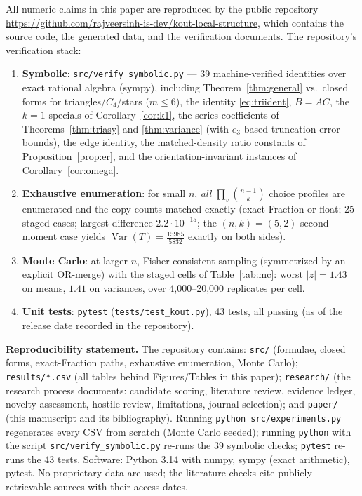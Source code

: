 \documentclass[11pt,a4paper]{article}
\theoremstyle{definition}
\theoremstyle{definition}
\begin{document}
All numeric claims in this paper are reproduced by the public repository
\url{https://github.com/rajveersinh-is-dev/kout-local-structure}, which
contains the source code, the generated data, and
the verification documents. The repository's verification stack:

\begin{enumerate}
\item \textbf{Symbolic}: \texttt{src/verify\_symbolic.py} — 39 machine-verified
identities over exact rational algebra (sympy), including Theorem~\ref{thm:general}
vs.\ closed forms for triangles/$C_4$/stars ($m\le6$), the identity
\eqref{eq:triident}, $B=AC$, the $k=1$ specials of Corollary~\ref{cor:k1}, the
series coefficients of Theorems~\ref{thm:triasy} and \ref{thm:variance}
(with $e_3$-based truncation error bounds), the edge identity, the matched-density
ratio constants of Proposition~\ref{prop:er}, and the orientation-invariant
instances of Corollary~\ref{cor:omega}.
\item \textbf{Exhaustive enumeration}: for small $n$, \emph{all}
$\prod_{v}\binom{n-1}{k}$ choice profiles are enumerated and the copy counts
matched exactly (exact-Fraction or float; 25 staged cases; largest difference
$2.2\cdot10^{-15}$; the $(n,k)=(5,2)$ second-moment case yields
$\operatorname{Var}(T) = \tfrac{15985}{5832}$ exactly on both sides).
\item \textbf{Monte Carlo}: at larger $n$, Fisher-consistent sampling
(symmetrized by an explicit OR-merge) with the staged cells of
Table~\ref{tab:mc}: worst $|z| = 1.43$ on means, $1.41$ on variances, over
4{,}000--20{,}000 replicates per cell.
\item \textbf{Unit tests}: \texttt{pytest} (\texttt{tests/test\_kout.py}),
43 tests, all passing (as of the release date recorded in the repository).
\end{enumerate}

\medskip
\noindent\textbf{Reproducibility statement.} The repository contains:
\texttt{src/} (formulae, closed forms, exact-Fraction paths, exhaustive
enumeration, Monte Carlo); \texttt{results/*.csv} (all tables behind
Figures/Tables in this paper); \texttt{research/} (the research process documents:
candidate scoring, literature review, evidence ledger, novelty assessment, hostile
review, limitations, journal selection); and \texttt{paper/} (this manuscript and
its bibliography). Running \texttt{python src/experiments.py} regenerates every
CSV from scratch (Monte Carlo seeded); running \texttt{python} with the script
\texttt{src/verify\_symbolic.py} re-runs the 39 symbolic checks;
\texttt{pytest} re-runs the 43 tests. Software: Python 3.14 with numpy, sympy (exact arithmetic), pytest.
No proprietary data are used; the literature checks cite publicly retrievable
sources with their access dates.
\end{document}
